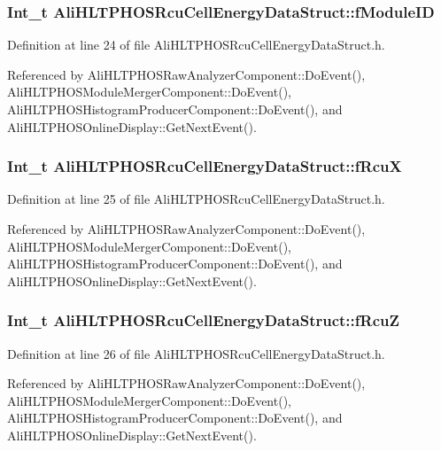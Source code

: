 \subsubsection{\setlength{\rightskip}{0pt plus 5cm}Int\_\-t {\bf Ali\-HLTPHOSRcu\-Cell\-Energy\-Data\-Struct::f\-Module\-ID}}\label{structAliHLTPHOSRcuCellEnergyDataStruct_o0}




Definition at line 24 of file Ali\-HLTPHOSRcu\-Cell\-Energy\-Data\-Struct.h.

Referenced by Ali\-HLTPHOSRaw\-Analyzer\-Component::Do\-Event(), Ali\-HLTPHOSModule\-Merger\-Component::Do\-Event(), Ali\-HLTPHOSHistogram\-Producer\-Component::Do\-Event(), and Ali\-HLTPHOSOnline\-Display::Get\-Next\-Event().
\subsubsection{\setlength{\rightskip}{0pt plus 5cm}Int\_\-t {\bf Ali\-HLTPHOSRcu\-Cell\-Energy\-Data\-Struct::f\-Rcu\-X}}\label{structAliHLTPHOSRcuCellEnergyDataStruct_o1}




Definition at line 25 of file Ali\-HLTPHOSRcu\-Cell\-Energy\-Data\-Struct.h.

Referenced by Ali\-HLTPHOSRaw\-Analyzer\-Component::Do\-Event(), Ali\-HLTPHOSModule\-Merger\-Component::Do\-Event(), Ali\-HLTPHOSHistogram\-Producer\-Component::Do\-Event(), and Ali\-HLTPHOSOnline\-Display::Get\-Next\-Event().
\subsubsection{\setlength{\rightskip}{0pt plus 5cm}Int\_\-t {\bf Ali\-HLTPHOSRcu\-Cell\-Energy\-Data\-Struct::f\-Rcu\-Z}}\label{structAliHLTPHOSRcuCellEnergyDataStruct_o2}




Definition at line 26 of file Ali\-HLTPHOSRcu\-Cell\-Energy\-Data\-Struct.h.

Referenced by Ali\-HLTPHOSRaw\-Analyzer\-Component::Do\-Event(), Ali\-HLTPHOSModule\-Merger\-Component::Do\-Event(), Ali\-HLTPHOSHistogram\-Producer\-Component::Do\-Event(), and Ali\-HLTPHOSOnline\-Display::Get\-Next\-Event().
